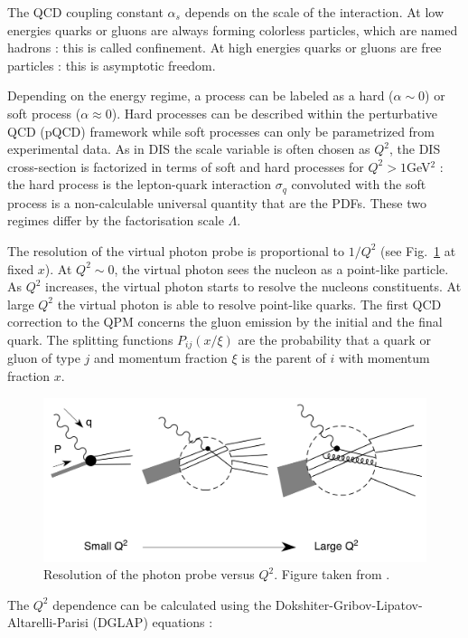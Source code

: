 The QCD coupling constant $\alpha_s$ depends on the scale of the interaction. At low energies quarks or gluons are always forming colorless particles, which are named hadrons : this is called confinement. At high energies quarks or gluons are free particles : this is asymptotic freedom.

Depending on the energy regime, a process can be labeled as a hard ($\alpha \sim 0$) or soft process ($\alpha \approx 0$). Hard processes can be described within the perturbative QCD (pQCD) framework while soft processes can only be parametrized from experimental data. As in DIS the scale variable is often chosen as $Q^2$, the DIS cross-section is factorized \cite{CollinsSoper} in terms of soft and hard processes for $Q^2>1$GeV$^2$ : the hard process is the lepton-quark interaction $\sigma_q$ convoluted with the soft process is a non-calculable universal quantity that are the PDFs. These two regimes differ by the factorisation scale $\Lambda$.

The resolution of the virtual photon probe is proportional to $1/Q^2$ (see Fig.~\ref{pic:Q2res} at fixed $x$). At $Q^2 \sim 0$, the virtual photon sees the nucleon as a point-like particle. As $Q^2$ increases, the virtual photon starts to resolve the nucleons constituents. At large $Q^2$ the virtual photon is able to resolve point-like quarks. The first QCD correction to the QPM concerns the gluon emission by the initial and the final quark. The splitting functions $P_{ij}(x/\xi)$ \cite{Joosten} are the probability that a quark or gluon of type $j$ and momentum fraction $\xi$ is the parent of $i$ with momentum fraction $x$.

\begin{figure}[!h]
  \centering
	\includegraphics[scale=0.6]{./gfx/Q2res.png}
	\caption{Resolution of the photon probe versus $Q^2$. Figure taken from \cite{PICH}.}
	\label{pic:Q2res}
\end{figure}

The $Q^2$ dependence can be calculated using the Dokshiter-Gribov-Lipatov-Altarelli-Parisi (DGLAP) equations \cite{Dokshitser, GL1, GL2, AP} :

